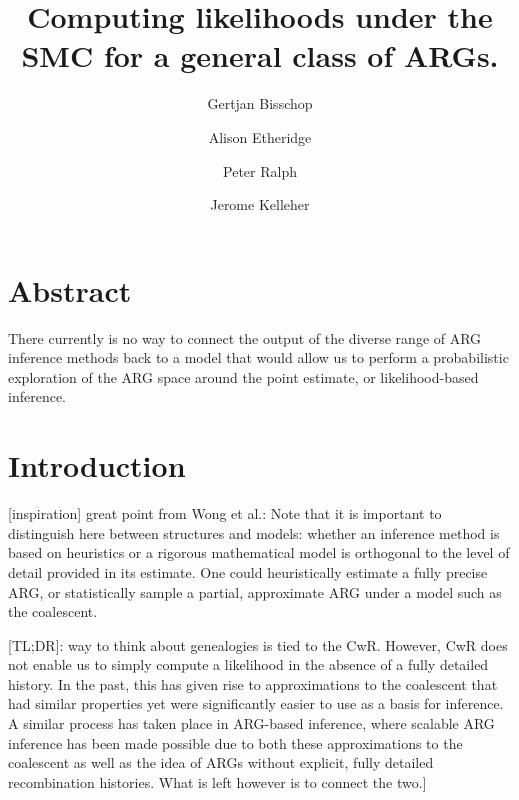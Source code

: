 \documentclass{article}
\begin{document}
\linenumbers
\title{Computing likelihoods under the SMC for a general class of ARGs.}

\author[1, $\dagger$]{Gertjan Bisschop}

\author[2]{Alison Etheridge}
\author[3]{Peter Ralph}

\author[1]{Jerome Kelleher}

\maketitle


\section{Abstract}
There currently is no way to connect the output of the diverse 
range of ARG inference methods back 
to a model that would allow us to perform a probabilistic exploration of the 
ARG space around the point estimate, or likelihood-based inference.

\section{Introduction}

[inspiration] great point from Wong et al.:
Note that it is important to distinguish here between structures and models: 
whether an inference method is based on 
heuristics or a rigorous mathematical model is orthogonal to the level 
of detail provided in its estimate. One could heuristically estimate a 
fully precise ARG, or statistically sample a partial, approximate ARG under 
a model such as the coalescent.

[TL;DR]: way to think about genealogies is tied to the CwR. However,
CwR does not enable us to simply compute a likelihood in the absence of a fully 
detailed history. In the past, this has given rise to approximations to the 
coalescent that had similar properties yet were significantly easier to use 
as a basis for inference. 
A similar process has taken place in ARG-based inference, 
where scalable ARG inference has been made possible due to both these approximations 
to the coalescent as well as the idea of ARGs without explicit, fully detailed 
recombination histories. What is left however is to connect the two.]
\end{document}
